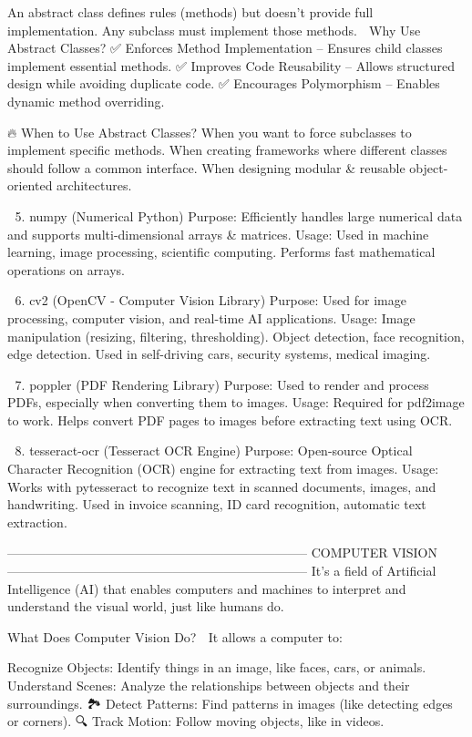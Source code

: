 An abstract class defines rules (methods) but doesn’t provide full implementation.
Any subclass must implement those methods.
📌 Why Use Abstract Classes?
✅ Enforces Method Implementation – Ensures child classes implement essential methods.
✅ Improves Code Reusability – Allows structured design while avoiding duplicate code.
✅ Encourages Polymorphism – Enables dynamic method overriding.

🔥 When to Use Abstract Classes?
When you want to force subclasses to implement specific methods.
When creating frameworks where different classes should follow a common interface.
When designing modular & reusable object-oriented architectures.

📌 5. numpy (Numerical Python)
Purpose: Efficiently handles large numerical data and supports multi-dimensional arrays & matrices.
Usage:
Used in machine learning, image processing, scientific computing.
Performs fast mathematical operations on arrays.

📌 6. cv2 (OpenCV - Computer Vision Library)
Purpose: Used for image processing, computer vision, and real-time AI applications.
Usage:
Image manipulation (resizing, filtering, thresholding).
Object detection, face recognition, edge detection.
Used in self-driving cars, security systems, medical imaging.

📌 7. poppler (PDF Rendering Library)
Purpose: Used to render and process PDFs, especially when converting them to images.
Usage:
Required for pdf2image to work.
Helps convert PDF pages to images before extracting text using OCR.

📌 8. tesseract-ocr (Tesseract OCR Engine)
Purpose: Open-source Optical Character Recognition (OCR) engine for extracting text from images.
Usage:
Works with pytesseract to recognize text in scanned documents, images, and handwriting.
Used in invoice scanning, ID card recognition, automatic text extraction.

-----------------------------------------------------------------------
COMPUTER VISION🧑‍💻👀
-----------------------------------------------------------------------
It’s a field of Artificial Intelligence (AI) that enables computers and machines to interpret and understand the visual world, just like humans do.

What Does Computer Vision Do? 🤔
It allows a computer to:

Recognize Objects: Identify things in an image, like faces, cars, or animals. 🦁🚗
Understand Scenes: Analyze the relationships between objects and their surroundings. 🏞️
Detect Patterns: Find patterns in images (like detecting edges or corners). 🔍
Track Motion: Follow moving objects, like in videos. 🎥

